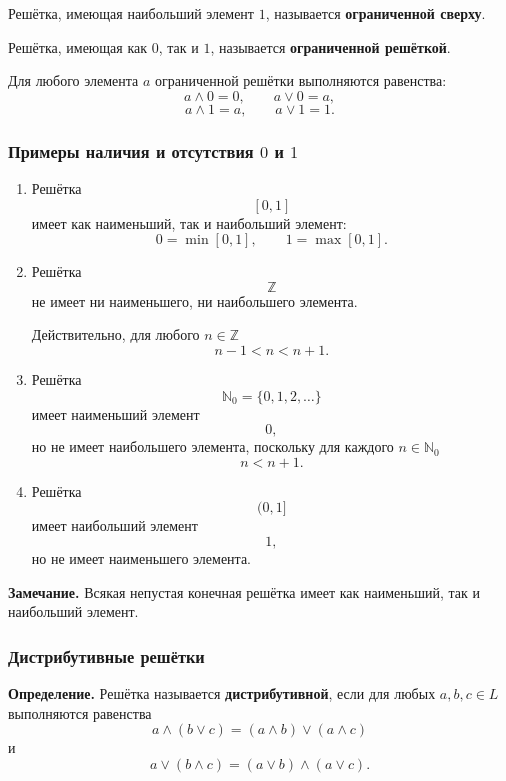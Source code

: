 \documentclass[12pt,a4paper,oneside,openany]{book}
\theoremstyle{definition}
\theoremstyle{plain}
\theoremstyle{remark}
\begin{document}
Решётка, имеющая наибольший элемент \(1\), называется
\textbf{ограниченной сверху}.

Решётка, имеющая как \(0\), так и \(1\), называется
\textbf{ограниченной решёткой}.

Для любого элемента \(a\) ограниченной решётки выполняются равенства:
\[
a\wedge0=0,
\qquad
a\vee0=a,
\]
\[
a\wedge1=a,
\qquad
a\vee1=1.
\]

\subsubsection{Примеры наличия и отсутствия \(0\) и \(1\)}


\begin{enumerate}
    \item Решётка
          \[
          [0,1]
          \]
          имеет как наименьший, так и наибольший элемент:
          \[
          0=\min[0,1],
          \qquad
          1=\max[0,1].
          \]

    \item Решётка
          \[
          \mathbb Z
          \]
          не имеет ни наименьшего, ни наибольшего элемента.

          Действительно, для любого \(n\in\mathbb Z\)
          \[
          n-1<n<n+1.
          \]

    \item Решётка
          \[
          \mathbb N_0=\{0,1,2,\ldots\}
          \]
          имеет наименьший элемент
          \[
          0,
          \]
          но не имеет наибольшего элемента, поскольку для каждого
          \(n\in\mathbb N_0\)
          \[
          n<n+1.
          \]

    \item Решётка
          \[
          (0,1]
          \]
          имеет наибольший элемент
          \[
          1,
          \]
          но не имеет наименьшего элемента.

\end{enumerate}

\textbf{Замечание.}
Всякая непустая конечная решётка имеет как наименьший, так и
наибольший элемент.

\subsubsection{Дистрибутивные решётки}

\textbf{Определение.}
Решётка называется \textbf{дистрибутивной}, если для любых
\(a,b,c\in L\) выполняются равенства
\[
a\wedge(b\vee c)
=
(a\wedge b)\vee(a\wedge c)
\]
и
\[
a\vee(b\wedge c)
=
(a\vee b)\wedge(a\vee c).
\]
\end{document}
